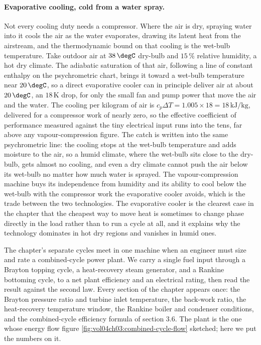 \paragraph{Evaporative cooling, cold from a water spray.} Not every cooling duty
needs a compressor. Where the air is dry, spraying water into it cools the air as
the water evaporates, drawing its latent heat from the airstream, and the
thermodynamic bound on that cooling is the wet-bulb temperature. Take outdoor air
at $38\,\degC$ dry-bulb and $15\,\%$ relative humidity, a hot dry climate. The
adiabatic saturation of that air, following a line of constant enthalpy on the
psychrometric chart, brings it toward a wet-bulb temperature near $20\,\degC$, so a
direct evaporative cooler can in principle deliver air at about $20\,\degC$, an
$18\,\si{\kelvin}$ drop, for only the small fan and pump power that move the air and
the water. The cooling per kilogram of air is $c_p \Delta T = 1.005 \times 18 =
18\,\text{kJ}/\text{kg}$, delivered for a compressor work of nearly zero, so
the effective coefficient of performance measured against the tiny electrical input
runs into the tens, far above any vapour-compression figure. The catch is written
into the same psychrometric line: the cooling stops at the wet-bulb temperature and
adds moisture to the air, so a humid climate, where the wet-bulb sits close to the
dry-bulb, gets almost no cooling, and even a dry climate cannot push the air below
its wet-bulb no matter how much water is sprayed. The vapour-compression machine
buys its independence from humidity and its ability to cool below the wet-bulb with
the compressor work the evaporative cooler avoids, which is the trade between the two
technologies. The evaporative cooler is the clearest case in the chapter that the
cheapest way to move heat is sometimes to change phase directly in the load rather
than to run a cycle at all, and it explains why the technology dominates in hot dry
regions and vanishes in humid ones.

The chapter's separate cycles meet in one machine when an engineer must
size and rate a combined-cycle power plant. We carry a single fuel input
through a Brayton topping cycle, a heat-recovery steam generator, and a
Rankine bottoming cycle, to a net plant efficiency and an electrical
rating, then read the result against the second law. Every section of the
chapter appears once: the Brayton pressure ratio and turbine inlet
temperature, the back-work ratio, the heat-recovery temperature window,
the Rankine boiler and condenser conditions, and the combined-cycle
efficiency formula of section 3.6. The plant is the one whose energy flow
figure \ref{fig:vol04ch03:combined-cycle-flow} sketched; here we put the
numbers on it.

